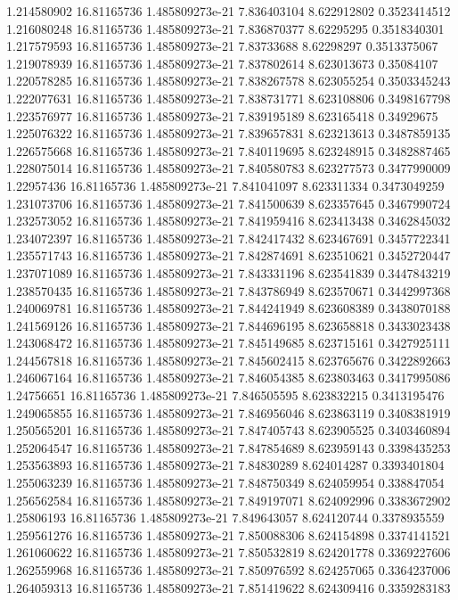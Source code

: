 {1.214580902 16.81165736 1.485809273e-21 7.836403104 8.622912802 0.3523414512
1.216080248 16.81165736 1.485809273e-21 7.836870377 8.62295295 0.3518340301
1.217579593 16.81165736 1.485809273e-21 7.83733688 8.62298297 0.3513375067
1.219078939 16.81165736 1.485809273e-21 7.837802614 8.623013673 0.35084107
1.220578285 16.81165736 1.485809273e-21 7.838267578 8.623055254 0.3503345243
1.222077631 16.81165736 1.485809273e-21 7.838731771 8.623108806 0.3498167798
1.223576977 16.81165736 1.485809273e-21 7.839195189 8.623165418 0.34929675
1.225076322 16.81165736 1.485809273e-21 7.839657831 8.623213613 0.3487859135
1.226575668 16.81165736 1.485809273e-21 7.840119695 8.623248915 0.3482887465
1.228075014 16.81165736 1.485809273e-21 7.840580783 8.623277573 0.3477990009
1.22957436 16.81165736 1.485809273e-21 7.841041097 8.623311334 0.3473049259
1.231073706 16.81165736 1.485809273e-21 7.841500639 8.623357645 0.3467990724
1.232573052 16.81165736 1.485809273e-21 7.841959416 8.623413438 0.3462845032
1.234072397 16.81165736 1.485809273e-21 7.842417432 8.623467691 0.3457722341
1.235571743 16.81165736 1.485809273e-21 7.842874691 8.623510621 0.3452720447
1.237071089 16.81165736 1.485809273e-21 7.843331196 8.623541839 0.3447843219
1.238570435 16.81165736 1.485809273e-21 7.843786949 8.623570671 0.3442997368
1.240069781 16.81165736 1.485809273e-21 7.844241949 8.623608389 0.3438070188
1.241569126 16.81165736 1.485809273e-21 7.844696195 8.623658818 0.3433023438
1.243068472 16.81165736 1.485809273e-21 7.845149685 8.623715161 0.3427925111
1.244567818 16.81165736 1.485809273e-21 7.845602415 8.623765676 0.3422892663
1.246067164 16.81165736 1.485809273e-21 7.846054385 8.623803463 0.3417995086
1.24756651 16.81165736 1.485809273e-21 7.846505595 8.623832215 0.3413195476
1.249065855 16.81165736 1.485809273e-21 7.846956046 8.623863119 0.3408381919
1.250565201 16.81165736 1.485809273e-21 7.847405743 8.623905525 0.3403460894
1.252064547 16.81165736 1.485809273e-21 7.847854689 8.623959143 0.3398435253
1.253563893 16.81165736 1.485809273e-21 7.84830289 8.624014287 0.3393401804
1.255063239 16.81165736 1.485809273e-21 7.848750349 8.624059954 0.338847054
1.256562584 16.81165736 1.485809273e-21 7.849197071 8.624092996 0.3383672902
1.25806193 16.81165736 1.485809273e-21 7.849643057 8.624120744 0.3378935559
1.259561276 16.81165736 1.485809273e-21 7.850088306 8.624154898 0.3374141521
1.261060622 16.81165736 1.485809273e-21 7.850532819 8.624201778 0.3369227606
1.262559968 16.81165736 1.485809273e-21 7.850976592 8.624257065 0.3364237006
1.264059313 16.81165736 1.485809273e-21 7.851419622 8.624309416 0.3359283183
}
